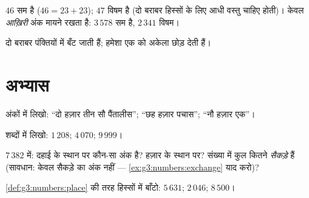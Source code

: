 \begin{example}
$46$ सम है ($46 = 23 + 23$); $47$ विषम है (दो बराबर हिस्सों के
लिए आधी वस्तु चाहिए होती)। केवल \emph{आख़िरी} अंक मायने रखता है:
$3\,578$ सम है, $2\,341$ विषम।
\end{example}

\begin{omfigure}

{\small {} दो बराबर पंक्तियों में बँट जाती हैं;  हमेशा एक को अकेला छोड़ देती हैं।}
\end{omfigure}

\section{अभ्यास}

\begin{exercise}[$\star$]\label{exo:g3:numbers:1}
अंकों में लिखो: ``दो हज़ार तीन सौ पैंतालीस''; ``छह
हज़ार पचास''; ``नौ हज़ार एक''।
\end{exercise}

\begin{exercise}[$\star$]\label{exo:g3:numbers:2}
शब्दों में लिखो: $1\,208$; \quad $4\,070$; \quad $9\,999$।
\end{exercise}

\begin{exercise}[$\star$]\label{exo:g3:numbers:3}
$7\,382$ में: दहाई के स्थान पर कौन-सा अंक है? हज़ार के स्थान
पर? संख्या में कुल कितने \emph{सैकड़े} हैं
(सावधान: केवल सैकड़े का अंक नहीं ---
\cref{ex:g3:numbers:exchange} याद करो)?
\end{exercise}

\begin{exercise}[$\star$]\label{exo:g3:numbers:4}
\cref{def:g3:numbers:place} की तरह हिस्सों में बाँटो:
$5\,631$; \quad $2\,046$; \quad $8\,500$।
\end{exercise}

